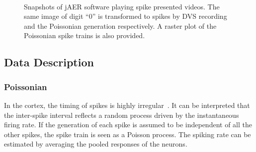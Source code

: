 \begin{figure}[hbt]
  \centering
  \\
  
  \caption{
  Snapshots of jAER software playing spike presented videos.
  The same image of digit ``0'' is transformed to spikes by DVS recording and the Poissonian generation respectively.
  A raster plot of the Poissonian spike trains is also provided.}
  \label{fig:zero}
\end{figure}

\subsection{Data Description}	
	\subsubsection{Poissonian}
	
	In the cortex, the timing of spikes is highly irregular~\citep{squire1998findings}.
	It can be interpreted that the inter-spike interval reflects a random process driven by the instantaneous firing rate.
	If the generation of each spike is assumed to be independent of all the other spikes, the spike train is seen as a Poisson process.
	The spiking rate can be estimated by averaging the pooled responses of the neurons.
		

